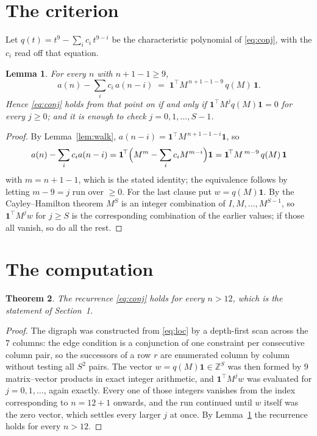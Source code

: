 \documentclass[11pt,a4paper]{article}
\theoremstyle{plain}
\newtheorem{theorem}{Theorem}
\newtheorem{lemma}[theorem]{Lemma}
\theoremstyle{definition}
\begin{document}
\section{The criterion}

Let $q(t)=t^{9}-\sum_i c_i\,t^{9-i}$ be the characteristic polynomial of
\eqref{eq:conj}, with the $c_i$ read off that equation.

\begin{lemma}\label{lem:crit}
For every $n$ with $n+1-1\ge9$,
\[
a(n)-\sum_i c_i\,a(n-i)\;=\;\mathbf{1}^{\!\top}M^{\,n+1-1-9}\,q(M)\,\mathbf{1} .
\]
Hence \eqref{eq:conj} holds from that point on if and only if
$\mathbf{1}^{\!\top}M^{j}q(M)\mathbf{1}=0$ for every $j\ge0$; and it is enough to check
$j=0,1,\dots,S-1$.
\end{lemma}

\begin{proof}
By Lemma~\ref{lem:walk}, $a(n-i)=\mathbf{1}^{\!\top}M^{\,n+1-1-i}\mathbf{1}$, so
\[
a(n)-\sum_i c_i a(n-i)
=\mathbf{1}^{\!\top}\Bigl(M^{m}-\sum_i c_i M^{m-i}\Bigr)\mathbf{1}
=\mathbf{1}^{\!\top}M^{\,m-9}\,q(M)\,\mathbf{1}
\]
with $m=n+1-1$, which is the stated identity; the equivalence follows by letting
$m-9=j$ run over $\ge0$. For the last clause put $w=q(M)\mathbf{1}$. By the
Cayley--Hamilton theorem $M^{S}$ is an integer combination of $I,M,\dots,M^{S-1}$, so
$\mathbf{1}^{\!\top}M^{j}w$ for $j\ge S$ is the corresponding combination of the earlier
values; if those all vanish, so do all the rest.
\end{proof}

\section{The computation}

\begin{theorem}
The recurrence \eqref{eq:conj} holds for every $n>12$, which is the statement of
Section~1.
\end{theorem}

\begin{proof}
The digraph was constructed from \eqref{eq:loc} by a depth-first scan across the $7$
columns: the edge condition is a conjunction of one constraint per consecutive column
pair, so the successors of a row $r$ are enumerated column by column without testing all
$S^2$ pairs. The vector $w=q(M)\mathbf{1}\in\mathbb{Z}^{S}$ was then formed by $9$
matrix--vector products in exact integer arithmetic, and $\mathbf{1}^{\!\top}M^{j}w$ was
evaluated for $j=0,1,\dots$, again exactly. Every one of those integers vanishes from the
index corresponding to $n=12+1$ onwards, and the run continued until $w$ itself was the
zero vector, which settles every larger $j$ at once. By Lemma~\ref{lem:crit} the recurrence
holds for every $n>12$.
\end{proof}
\end{document}
